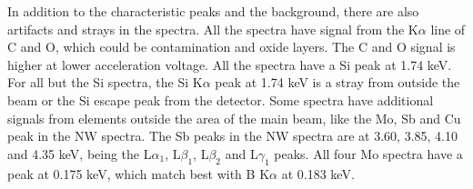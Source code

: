 In addition to the characteristic peaks and the background, there are also artifacts and strays in the spectra. %
All the spectra have signal from the K$\alpha$ line of C and O, which could be contamination and oxide layers. %
The C and O signal is higher at lower acceleration voltage.
All the spectra have a Si peak at 1.74 keV. %
For all but the Si spectra, the Si K$\alpha$ peak at 1.74 keV is a stray from outside the beam or the Si escape peak from the detector.
Some spectra have additional signals from elements outside the area of the main beam, like the Mo, Sb and Cu peak in the NW spectra. %
The Sb peaks in the NW spectra are at 3.60, 3.85, 4.10 and 4.35 keV, being the L$\alpha_1$, L$\beta_1$, L$\beta_2$ and L$\gamma_1$ peaks.
All four Mo spectra have a peak at 0.175 keV, which match best with B K$\alpha$ at 0.183 keV.



